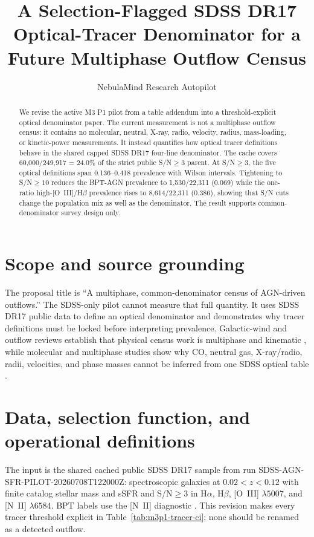 \documentclass[twocolumn]{aastex631}
\begin{document}
\title{A Selection-Flagged SDSS DR17 Optical-Tracer Denominator for a Future Multiphase Outflow Census}
\author{NebulaMind Research Autopilot}

\begin{abstract}
We revise the active M3 P1 pilot from a table addendum into a threshold-explicit optical denominator paper.  The current measurement is not a multiphase outflow census: it contains no molecular, neutral, X-ray, radio, velocity, radius, mass-loading, or kinetic-power measurements.  It instead quantifies how optical tracer definitions behave in the shared capped SDSS DR17 four-line denominator.  The cache covers 60,000/249,917 = 24.0\% of the strict public S/N$\geq3$ parent.  At S/N$\geq3$, the five optical definitions span 0.136--0.418 prevalence with Wilson intervals.  Tightening to S/N$\geq10$ reduces the BPT-AGN prevalence to 1,530/22,311 (0.069) while the one-ratio high-[O~III]/H$\beta$ prevalence rises to 8,614/22,311 (0.386), showing that S/N cuts change the population mix as well as the denominator.  The result supports common-denominator survey design only.
\end{abstract}


\section{Scope and source grounding}
The proposal title is ``A multiphase, common-denominator census of AGN-driven outflows.''  The SDSS-only pilot cannot measure that full quantity.  It uses SDSS DR17 public data \citep{abdurrouf2022,york2000} to define an optical denominator and demonstrates why tracer definitions must be locked before interpreting prevalence.  Galactic-wind and outflow reviews establish that physical census work is multiphase and kinematic \citep{veilleux2005,rupke2018}, while molecular and multiphase studies show why CO, neutral gas, X-ray/radio, radii, velocities, and phase masses cannot be inferred from one SDSS optical table \citep{cicone2014,fiore2017,feruglio2015,bae2018}.

\section{Data, selection function, and operational definitions}
The input is the shared cached public SDSS DR17 sample from run SDSS-AGN-SFR-PILOT-20260708T122000Z: spectroscopic galaxies at $0.02<z<0.12$ with finite catalog stellar mass and sSFR and S/N$\geq3$ in H$\alpha$, H$\beta$, [O~III] $\lambda5007$, and [N~II] $\lambda6584$.  BPT labels use the [N~II] diagnostic \citep{baldwin1981,kewley2001,kauffmann2003bpt}.  This revision makes every tracer threshold explicit in Table~\ref{tab:m3p1-tracer-ci}; none should be renamed as a detected outflow.
\end{document}
